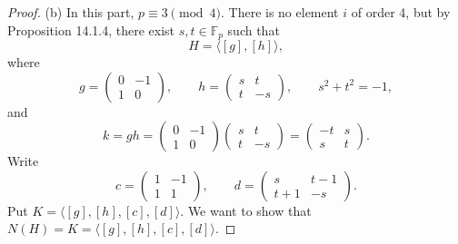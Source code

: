 \documentclass[11pt,a4paper]{article}
\newcommand{\F}{\mathbb{F}}
\begin{document}
{\begin{proof}
\item[(b)] In this part, $p \equiv 3 \pmod 4$. There is no element $i$ of order 4, but by Proposition 14.1.4, there exist $s,t \in \F_p$ such that
$$H = \langle  [g],[h] \rangle,$$ where
$$g = \begin{pmatrix} 0 & -1\\1 & 0 \end{pmatrix}, \qquad h = \begin{pmatrix} s& t \\t & -s \end{pmatrix}, \qquad s^2+t^2 = -1,$$
and
$$k = gh = \begin{pmatrix} 0 & -1\\1 & 0 \end{pmatrix}\begin{pmatrix} s& t \\t & -s \end{pmatrix}= \begin{pmatrix} -t& s \\s & t \end{pmatrix}.$$
Write
$$c = \begin{pmatrix} 1 & -1\\1 & 1 \end{pmatrix},\qquad  d = \begin{pmatrix} s & t-1\\t+1 & -s \end{pmatrix}.$$
Put $K = \langle [g],[h],[c],[d]\rangle$. We want to show that $N(H) = K = \langle [g],[h],[c],[d]\rangle.$


\end{proof}}
\end{document}

